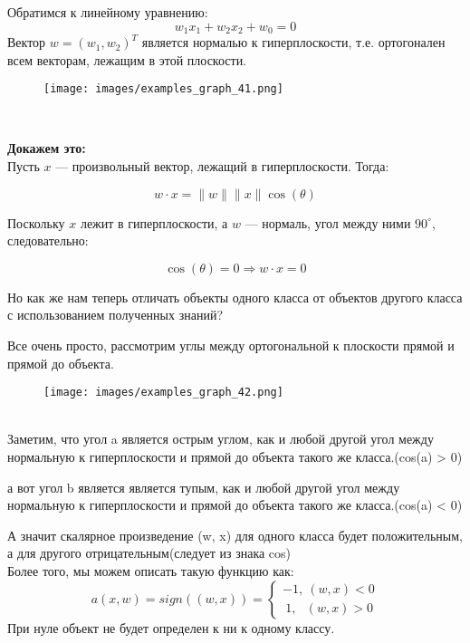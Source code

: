 Обратимся к линейному уравнению:
\[
    w_1 x_1 + w_2 x_2 + w_0 = 0
\]
Вектор \(w = (w_1, w_2)^T\) является нормалью к гиперплоскости, т.е. ортогонален всем векторам, лежащим в этой плоскости.


\begin{figure}[htbp]
        \centering
        \texttt{[image: images/examples\_graph\_41.png]}
        \label{fig:example_41}
\end{figure} \\
\vspace{0.5cm}

\textbf{Докажем это:} \\

Пусть \(x\) — произвольный вектор, лежащий в гиперплоскости. Тогда:

\[
w \cdot x = \|w\| \|x\| \cos(\theta)
\]

Поскольку \(x\) лежит в гиперплоскости, а \(w\) — нормаль, угол между ними \(90^\circ\), следовательно:

\[
\cos(\theta) = 0 \Rightarrow w \cdot x = 0
\]


\blacksquare

\vspace{0,5cm}
Но как же  нам теперь отличать объекты одного класса от объектов другого класса с использованием полученных знаний?

Все очень просто, рассмотрим углы между ортогональной к плоскости прямой и прямой до объекта.
\begin{figure}[htbp]
        \centering
        \texttt{[image: images/examples\_graph\_42.png]}
        \label{fig:example_42}
\end{figure} \\

Заметим, что угол a является \(\textbf{острым углом}\), как и любой другой угол между нормальную к гиперплоскости
и прямой до объекта такого же класса.(cos(a) > 0)\\
\vspace{0.3cm}

а вот угол b является является \(\textbf{тупым}\), как и любой другой угол между нормальную к гиперплоскости
и прямой до объекта такого же класса.(cos(a) < 0) \\
\vspace{0.3cm}

А значит скалярное произведение (w, x) для одного класса будет положительным,
а для другого отрицательным(следует из знака cos) \\
Более того, мы можем описать такую функцию как:
\[
    a(x, w) = sign((w, x)) = \begin{cases}
                                -1, \ (w, x) < 0 \\
                                \ 1,  \ \ \ (w, x) > 0
                                \end{cases}
\]
При нуле объект не будет определен к ни к одному классу.

